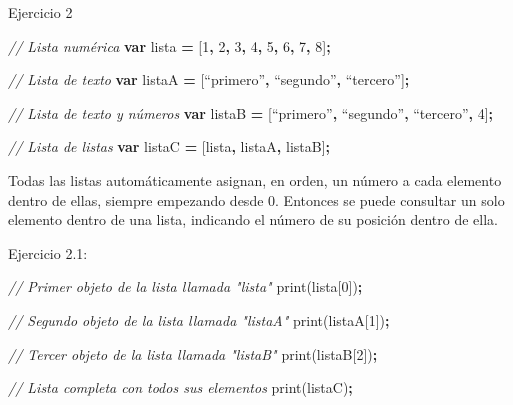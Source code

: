 \documentclass[
  12pt,
  letterpaper,
  twoside]{book}
\newenvironment{Shaded}{\begin{snugshade}}{\end{snugshade}}
\newcommand{\CommentTok}[1]{\textcolor[rgb]{0.56,0.35,0.01}{\textit{#1}}}
\newcommand{\DecValTok}[1]{\textcolor[rgb]{0.00,0.00,0.81}{#1}}
\newcommand{\FunctionTok}[1]{\textcolor[rgb]{0.00,0.00,0.00}{#1}}
\newcommand{\KeywordTok}[1]{\textcolor[rgb]{0.13,0.29,0.53}{\textbf{#1}}}
\newcommand{\NormalTok}[1]{#1}
\newcommand{\OperatorTok}[1]{\textcolor[rgb]{0.81,0.36,0.00}{\textbf{#1}}}
\begin{document}
Ejercicio 2

\begin{Shaded}
\begin{Highlighting}[]
\CommentTok{// Lista numérica}
\KeywordTok{var}\NormalTok{ lista }\OperatorTok{=}\NormalTok{ [}\DecValTok{1}\OperatorTok{,} \DecValTok{2}\OperatorTok{,} \DecValTok{3}\OperatorTok{,} \DecValTok{4}\OperatorTok{,} \DecValTok{5}\OperatorTok{,} \DecValTok{6}\OperatorTok{,} \DecValTok{7}\OperatorTok{,} \DecValTok{8}\NormalTok{]}\OperatorTok{;}   
  
\CommentTok{// Lista de texto            }
\KeywordTok{var}\NormalTok{ listaA }\OperatorTok{=}\NormalTok{ [“primero”}\OperatorTok{,}\NormalTok{ “segundo”}\OperatorTok{,}\NormalTok{ “tercero”]}\OperatorTok{;} 
   
\CommentTok{// Lista de texto y números  }
\KeywordTok{var}\NormalTok{ listaB }\OperatorTok{=}\NormalTok{ [“primero”}\OperatorTok{,}\NormalTok{ “segundo”}\OperatorTok{,}\NormalTok{ “tercero”}\OperatorTok{,} \DecValTok{4}\NormalTok{]}\OperatorTok{;} 

\CommentTok{// Lista de listas  }
\KeywordTok{var}\NormalTok{ listaC }\OperatorTok{=}\NormalTok{ [lista}\OperatorTok{,}\NormalTok{ listaA}\OperatorTok{,}\NormalTok{ listaB]}\OperatorTok{;} 
\end{Highlighting}
\end{Shaded}

Todas las listas automáticamente asignan, en orden, un número a cada elemento dentro de ellas, siempre empezando desde 0. Entonces se puede consultar un solo elemento dentro de una lista, indicando el número de su posición dentro de ella.

Ejercicio 2.1:

\begin{Shaded}
\begin{Highlighting}[]
\CommentTok{// Primer objeto de la lista llamada "lista"}
\FunctionTok{print}\NormalTok{(lista[}\DecValTok{0}\NormalTok{])}\OperatorTok{;} 

\CommentTok{// Segundo objeto de la lista llamada "listaA"}
\FunctionTok{print}\NormalTok{(listaA[}\DecValTok{1}\NormalTok{])}\OperatorTok{;}

\CommentTok{// Tercer objeto de la lista llamada "listaB"}
\FunctionTok{print}\NormalTok{(listaB[}\DecValTok{2}\NormalTok{])}\OperatorTok{;}

\CommentTok{// Lista completa con todos sus elementos}
\FunctionTok{print}\NormalTok{(listaC)}\OperatorTok{;}    
\end{Highlighting}
\end{Shaded}
\end{document}
